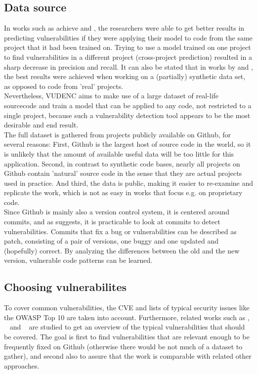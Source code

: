 \documentclass[
	a4paper,
	pagesize,
	pdftex,
	12pt,
	twoside, %
	BCOR=5mm, %
	ngerman,
	fleqn,
	final,
	]{scrartcl}
\begin{document}
\subsection{Data source}
In works such as \cite{Dam.2017} achieve and \cite{Pang.2015}, the researchers were able to get better results in predicting vulnerabilities if they were applying their model to code from the same project that it had been trained on. Trying to use a model trained on one project to find vulnerabilities in a different project (cross-project prediction) resulted in a sharp decrease in precision and recall. It can also be stated that in works by \cite{Russell.2018} and \cite{Li.2018}, the best results were achieved when working on a (partially) synthetic data set, as opposed to code from 'real' projects.\\
Nevertheless, VUDENC aims to make use of a large dataset of real-life sourcecode and train a model that can be applied to any code, not restricted to a single project, because such a vulnerability detection tool appears to be the most desirable and end result.\\
The full dataset is gathered from projects publicly available on Github, for several reasons: First, Github is the largest host of source code in the world, so it is unlikely that the amount of available useful data will be too little for this application. Second, in contrast to synthetic code bases, nearly all projects on Github contain 'natural' source code in the sense that they are actual projects used in practice. And third, the data is public, making it easier to re-examine and replicate the work, which is not as easy in works that focus e.g. on proprietary code.\\
Since Github is mainly also a version control system, it is centered around commits, and as \cite{Zhou.2017} suggests, it is practicable to look at commits to detect vulnerabilities. Commits that fix a bug or vulnerabilities can be described as patch, consisting of a pair of versions, one buggy and one updated and (hopefully) correct.  By analyzing the differences between the old and the new version, vulnerable code patterns can be learned. \\

\subsection{Choosing vulnerabilites}
To cover common vulnerabilities, the CVE \cite{CVE} and lists of typical security issues like the OWASP Top 10 \cite{OWASPFoundation.} are taken into account. Furthermore, related works such as \cite{Zhou.2017}, ~\cite{Medeiros.2014} and ~\cite{Yamaguchi.2012} are studied to get an overview of the typical vulnerabilities that should be covered. The goal is first to find vulnerabilities that are relevant enough to be frequently fixed on Github (otherwise there would be not much of a dataset to gather), and second also to assure that the work is comparable with related other approaches. 
\end{document}
